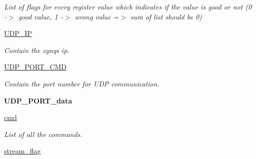 \begin{DoxyCompactItemize}
\begin{DoxyCompactList}\small\item\em List of flags for every register value which indicates if the value is good or not (0 -\/$>$ good value, 1 -\/$>$ wrong value =$>$ sum of list should be 0) \end{DoxyCompactList}\item 
\mbox{\label{classwatchman_1_1_watchman__main__window_a3068fe73ce063fec03c7e9f21408baac}} 
\mbox{\hyperlink{classwatchman_1_1_watchman__main__window_a3068fe73ce063fec03c7e9f21408baac}{U\+D\+P\+\_\+\+IP}}
\begin{DoxyCompactList}\small\item\em Contain the zynq\textquotesingle{}s ip. \end{DoxyCompactList}\item 
\mbox{\label{classwatchman_1_1_watchman__main__window_a41a6510deb1b971886b41b0229a49691}} 
\mbox{\hyperlink{classwatchman_1_1_watchman__main__window_a41a6510deb1b971886b41b0229a49691}{U\+D\+P\+\_\+\+P\+O\+R\+T\+\_\+\+C\+MD}}
\begin{DoxyCompactList}\small\item\em Contain the port number for U\+DP communication. \end{DoxyCompactList}\item 
\mbox{\label{classwatchman_1_1_watchman__main__window_a14cf83a45dee5b496b1b2f1455183993}} 
{\bfseries U\+D\+P\+\_\+\+P\+O\+R\+T\+\_\+data}
\item 
\mbox{\label{classwatchman_1_1_watchman__main__window_a310b7c8167f86e485d54689b8aa1ed12}} 
\mbox{\hyperlink{classwatchman_1_1_watchman__main__window_a310b7c8167f86e485d54689b8aa1ed12}{cmd}}
\begin{DoxyCompactList}\small\item\em List of all the commands. \end{DoxyCompactList}\item 
\mbox{\label{classwatchman_1_1_watchman__main__window_a608d68c02b11a3ba990599f3f74966db}} 
\mbox{\hyperlink{classwatchman_1_1_watchman__main__window_a608d68c02b11a3ba990599f3f74966db}{stream\+\_\+flag}}

\end{DoxyCompactItemize}
